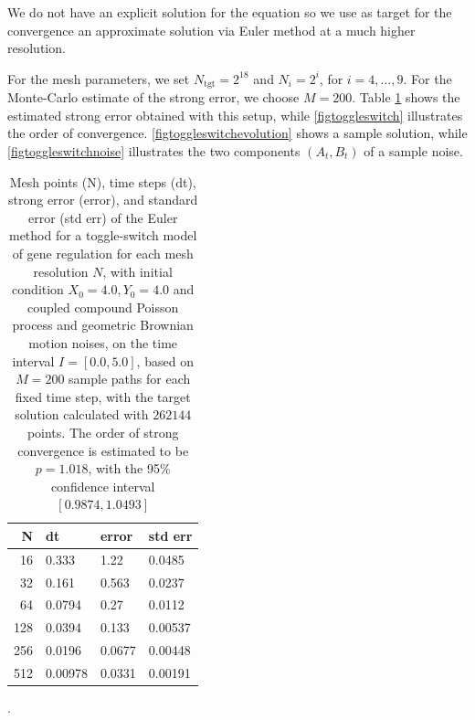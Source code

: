\documentclass[reqno,12pt]{amsart}
\theoremstyle{plain} %
\theoremstyle{definition} %
\begin{document}
We do not have an explicit solution for the equation so we use as target for the convergence an approximate solution via Euler method at a much higher resolution.

For the mesh parameters, we set $N_{\textrm{tgt}} = 2^{18}$ and $N_i = 2^i$, for $i=4, \ldots, 9$. For the Monte-Carlo estimate of the strong error, we choose $M = 200.$ Table \ref{tabletoggleswitch} shows the estimated strong error obtained with this setup, while \cref{figtoggleswitch} illustrates the order of convergence. \cref{figtoggleswitchevolution} shows a sample solution, while \cref{figtoggleswitchnoise} illustrates the two components $(A_t, B_t)$ of a sample noise.

\begin{table}
    \begin{tabular}[htb]{|r|l|l|l|}
        \hline N & dt & error & std err \\
        \hline \hline
        16 & 0.333 & 1.22 & 0.0485 \\
        32 & 0.161 & 0.563 & 0.0237 \\
        64 & 0.0794 & 0.27 & 0.0112 \\
        128 & 0.0394 & 0.133 & 0.00537 \\
        256 & 0.0196 & 0.0677 & 0.00448 \\
        512 & 0.00978 & 0.0331 & 0.00191 \\
        \hline
    \end{tabular}
    \bigskip

    \caption{Mesh points (N), time steps (dt), strong error (error), and standard error (std err) of the Euler method for a toggle-switch model of gene regulation for each mesh resolution $N$, with initial condition $X_0 = 4.0, Y_0 = 4.0$ and coupled compound Poisson process and geometric Brownian motion noises, on the time interval $I = [0.0, 5.0]$, based on $M = 200$ sample paths for each fixed time step, with the target solution calculated with $262144$ points. The order of strong convergence is estimated to be $p = 1.018$, with the 95\% confidence interval $[0.9874, 1.0493]$}.
    \label{tabletoggleswitch}
\end{table}
\end{document}
